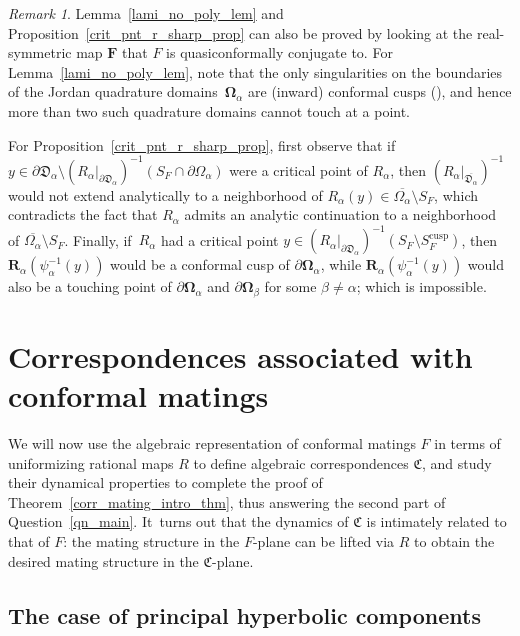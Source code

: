\documentclass[JEP,XML,SOM,Unicode,NoFloatCountersInSection,published]{cedram}
\theoremstyle{definition}
\theoremstyle{remark}
\newtheorem{remark}[lemma]{Remark}
\begin{document}
\begin{remark}
Lemma~\ref{lami_no_poly_lem} and Proposition~\ref{crit_pnt_r_sharp_prop} can also be proved by looking at the real-symmetric map $\pmb{F}$ that $F$ is quasiconformally conjugate to. For Lemma~\ref{lami_no_poly_lem}, note that the only singularities on the boundaries of the Jordan quadrature \hbox{domains}~$\pmb{\Omega}_\alpha$ are (inward) conformal cusps (\cf \cite{Sak91}), and hence more than two such quadrature domains cannot touch at a point.

For Proposition~\ref{crit_pnt_r_sharp_prop}, first observe that if $y\in\partial\mathfrak{D}_\alpha\setminus (R_\alpha\vert_{\partial\mathfrak{D}_\alpha})^{-1}(S_F\cap\partial\Omega_\alpha)$ were a critical point of $R_\alpha$, then $(R_\alpha\vert_{\overline{\mathfrak{D}_\alpha}})^{-1}$ would not extend analytically to a neighborhood of $R_\alpha(y)\in\overline{\Omega_\alpha}\setminus S_F$, which contradicts the fact that $R_\alpha$ admits an analytic continuation to a neighborhood of $\overline{\Omega_\alpha}\setminus S_F$. Finally, if~$R_\alpha$ had a critical point $y\in(R_\alpha\vert_{\partial\mathfrak{D}_\alpha})^{-1}(S_F \setminus S_F^{\mathrm{cusp}})$, then $\pmb{R}_\alpha(\psi_\alpha^{-1}(y))$ would be a conformal cusp of $\partial\pmb{\Omega}_\alpha$, while $\pmb{R}_\alpha(\psi_\alpha^{-1}(y))$ would also be a touching point of $\partial\pmb{\Omega}_\alpha$ and $\partial\pmb{\Omega}_\beta$ for some $\beta\neq\alpha$; which is impossible.
\end{remark}

\section{Correspondences associated with conformal matings}\label{corr_sec}

We will now use the algebraic representation of conformal matings $F$ in terms of uniformizing rational maps $R$ to define algebraic correspondences $\mathfrak{C}$, and study their dynamical properties to complete the proof of Theorem~\ref{corr_mating_intro_thm}, thus answering the second part of Question~\ref{qn_main}. It~turns out that the dynamics of $\mathfrak{C}$ is intimately related to that of $F$: the mating structure in the $F$-plane can be lifted via $R$ to obtain the desired mating structure in the $\mathfrak{C}$-plane.

\subsection{The case of principal hyperbolic components}\label{special_corr_subsec}
\end{document}
